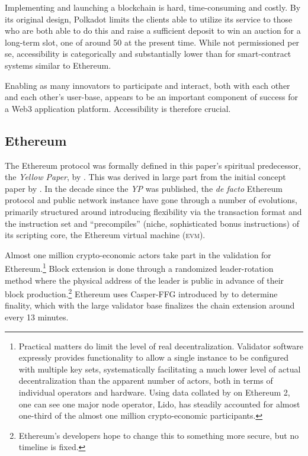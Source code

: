 Implementing and launching a blockchain is hard, time-consuming and costly. By its original design, Polkadot limits the clients able to utilize its service to those who are both able to do this and raise a sufficient deposit to win an auction for a long-term slot, one of around 50 at the present time. While not permissioned per se, accessibility is categorically and substantially lower than for smart-contract systems similar to Ethereum.

Enabling as many innovators to participate and interact, both with each other and each other's user-base, appears to be an important component of success for a Web3 application platform. Accessibility is therefore crucial.

\subsection{Ethereum}

The Ethereum protocol was formally defined in this paper's spiritual predecessor, the \emph{Yellow Paper}, by \cite{wood2014ethereum}. This was derived in large part from the initial concept paper by \cite{buterin2013ethereum}. In the decade since the \emph{YP} was published, the \emph{de facto} Ethereum protocol and public network instance have gone through a number of evolutions, primarily structured around introducing flexibility via the transaction format and the instruction set and ``precompiles'' (niche, sophisticated bonus instructions) of its scripting core, the Ethereum virtual machine (\textsc{evm}).

Almost one million crypto-economic actors take part in the validation for Ethereum.\footnote{Practical matters do limit the level of real decentralization. Validator software expressly provides functionality to allow a single instance to be configured with multiple key sets, systematically facilitating a much lower level of actual decentralization than the apparent number of actors, both in terms of individual operators and hardware. Using data collated by \cite{hildobby2024eth2} on Ethereum 2, one can see one major node operator, Lido, has steadily accounted for almost one-third of the almost one million crypto-economic participants.} Block extension is done through a randomized leader-rotation method where the physical address of the leader is public in advance of their block production.\footnote{Ethereum's developers hope to change this to something more secure, but no timeline is fixed.} Ethereum uses Casper-FFG introduced by \cite{buterin2019casper} to determine finality, which with the large validator base finalizes the chain extension around every 13 minutes.

